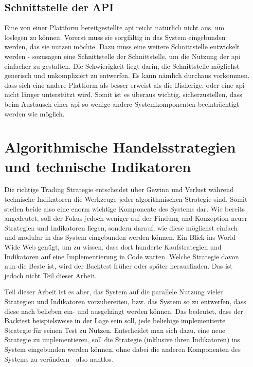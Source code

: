 \documentclass[oneside]{ausarbeitung}
\begin{document}
\subsection{Schnittstelle der API}
\label{sub:schnittstelle_der_api}

Eine von einer Plattform bereitgestellte \ac{api} reicht natürlich
nicht aus, um loslegen zu können. Vorerst muss sie sorgfältig in das
System eingebunden werden, das sie nutzen möchte. Dazu muss eine
weitere Schnittstelle entwickelt werden - sozusagen eine Schnittstelle
der Schnittstelle, um die Nutzung der \ac{api} einfacher zu gestalten.
Die Schwierigkeit liegt darin, die Schnittstelle möglichst generisch
und unkompliziert zu entwerfen. Es kann nämlich durchaus vorkommen,
dass sich eine andere Plattform als besser erweist als die Bisherige,
oder eine \ac{api} nicht länger unterstützt wird. Somit ist es
überaus wichtig, sicherzustellen, dass beim Austausch einer \ac{api}
so wenige andere Systemkomponenten beeinträchtigt werden wie
möglich.


\section{Algorithmische Handelsstrategien und technische Indikatoren}
\label{sec:strategie_und_indikatoren}

Die richtige Trading Strategie entscheidet über Gewinn und Verlust
während technische Indikatoren die Werkzeuge jeder algorithmischen
Strategie sind. Somit stellen beide also eine enorm wichtige
Komponente des Systems dar. Wie bereits angedeutet, soll der Fokus
jedoch weniger auf der Findung und Konzeption neuer Strategien und
Indikatoren liegen, sondern darauf, wie diese möglichst einfach und
modular in das System eingebunden werden können. Ein Blick ins World
Wide Web genügt, um zu wissen, dass dort hunderte Kaufstrategien und
Indikatoren auf eine Implementierung in Code warten. Welche Strategie
davon nun die Beste ist, wird der Backtest früher oder später
herausfinden. Das ist jedoch nicht Teil dieser Arbeit.

Teil dieser Arbeit ist es aber, das System auf die parallele Nutzung
vieler Strategien und Indikatoren vorzubereiten, bzw. das System so zu
entwerfen, dass diese nach belieben ein- und ausgehängt werden
können. Das bedeutet, dass der Backtest beispielsweise in der Lage
sein soll, jede beliebige implementierte Strategie für seinen Test zu
Nutzen. Entscheidet man sich dazu, eine neue Strategie zu
implementieren, soll die Strategie (inklusive ihren Indikatoren) ins
System eingebunden werden können, ohne dabei die anderen Komponenten
des Systems zu verändern - also nahtlos. \\
\end{document}
